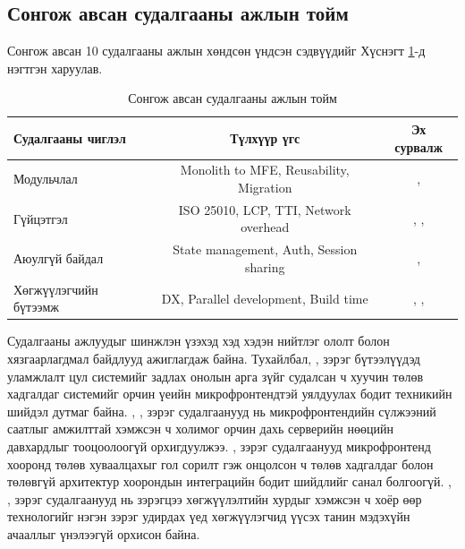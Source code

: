 \subsection{Сонгож авсан судалгааны ажлын тойм}
Сонгож авсан 10 судалгааны ажлын хөндсөн үндсэн сэдвүүдийг Хүснэгт \ref{tab:related_work_summary}-д нэгтгэн харуулав.

\begin{table}[H]
\centering
\caption{Сонгож авсан судалгааны ажлын тойм}
\label{tab:related_work_summary}
\renewcommand{\arraystretch}{0.7}
\begin{tabular}{lcc}
\toprule
\textbf{Судалгааны чиглэл} & \textbf{Түлхүүр үгс} & \textbf{Эх сурвалж} \\
\midrule

Модульчлал & Monolith to MFE, Reusability, Migration & \cite{mannisto2023}, \cite{pavlenko2020} \\ 
Гүйцэтгэл & ISO 25010, LCP, TTI, Network overhead & \cite{ameer2024}, \cite{taibi2022}, \cite{stefanovska2022} \\ 
Аюулгүй байдал & State management, Auth, Session sharing & \cite{silva2024}, \cite{mohammed2022} \\
Хөгжүүлэгчийн бүтээмж & DX, Parallel development, Build time & \cite{bjelotomic2024}, \cite{tilak2020}, \cite{montelius2021} \\ 
\bottomrule
\end{tabular}
\end{table}

Судалгааны ажлуудыг шинжлэн үзэхэд хэд хэдэн нийтлэг ололт болон хязгаарлагдмал байдлууд ажиглагдаж байна. Тухайлбал, \cite{mannisto2023}, \cite{pavlenko2020} зэрэг бүтээлүүдэд уламжлалт цул системийг задлах онолын арга зүйг судалсан ч хуучин төлөв хадгалдаг системийг орчин үеийн микрофронтендтэй уялдуулах бодит техникийн шийдэл дутмаг байна. \cite{ameer2024}, \cite{taibi2022}, \cite{stefanovska2022} зэрэг судалгаанууд нь микрофронтендийн сүлжээний саатлыг амжилттай хэмжсэн ч холимог орчин дахь серверийн нөөцийн давхардлыг тооцоолоогүй орхигдуулжээ. \cite{silva2024}, \cite{mohammed2022} зэрэг судалгаанууд микрофронтенд хооронд төлөв хуваалцахыг гол сорилт гэж онцолсон ч төлөв хадгалдаг болон төлөвгүй архитектур хоорондын интеграцийн бодит шийдлийг санал болгоогүй. \cite{bjelotomic2024}, \cite{tilak2020}, \cite{montelius2021} зэрэг судалгаанууд нь зэрэгцээ хөгжүүлэлтийн хурдыг хэмжсэн ч хоёр өөр технологийг нэгэн зэрэг удирдах үед хөгжүүлэгчид үүсэх танин мэдэхүйн ачааллыг үнэлээгүй орхисон байна.

